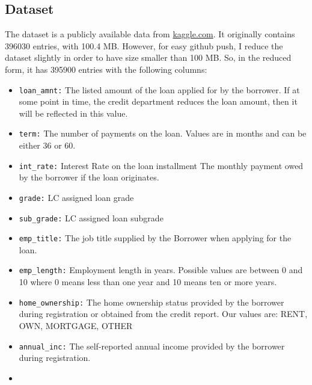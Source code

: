 \documentclass[
  letterpaper,
  DIV=11,
  numbers=noendperiod]{scrartcl}
\providecommand{\tightlist}{%
  \setlength{\itemsep}{0pt}\setlength{\parskip}{0pt}}
\begin{document}
\subsection{Dataset}\label{dataset}

The dataset is a publicly available data from
\href{https://www.kaggle.com/datasets/jeandedieunyandwi/lending-club-dataset}{kaggle.com}.
It originally contains 396030 entries, with 100.4 MB. However, for easy
github push, I reduce the dataset slightly in order to have size smaller
than 100 MB. So, in the reduced form, it has 395900 entries with the
following columns:

\begin{itemize}
\tightlist
\item
  \texttt{loan\_amnt:} The listed amount of the loan applied for by the
  borrower. If at some point in time, the credit department reduces the
  loan amount, then it will be reflected in this value.\\
\item
  \texttt{term:} The number of payments on the loan. Values are in
  months and can be either 36 or 60.\\
\item
  \texttt{int\_rate:} Interest Rate on the loan installment The monthly
  payment owed by the borrower if the loan originates.\\
\item
  \texttt{grade:} LC assigned loan grade\\
\item
  \texttt{sub\_grade:} LC assigned loan subgrade\\
\item
  \texttt{emp\_title:} The job title supplied by the Borrower when
  applying for the loan.\\
\item
  \texttt{emp\_length:} Employment length in years. Possible values are
  between 0 and 10 where 0 means less than one year and 10 means ten or
  more years.\\
\item
  \texttt{home\_ownership:} The home ownership status provided by the
  borrower during registration or obtained from the credit report. Our
  values are: RENT, OWN, MORTGAGE, OTHER\\
\item
  \texttt{annual\_inc:} The self-reported annual income provided by the
  borrower during registration.\\
\item

\end{itemize}
\end{document}
